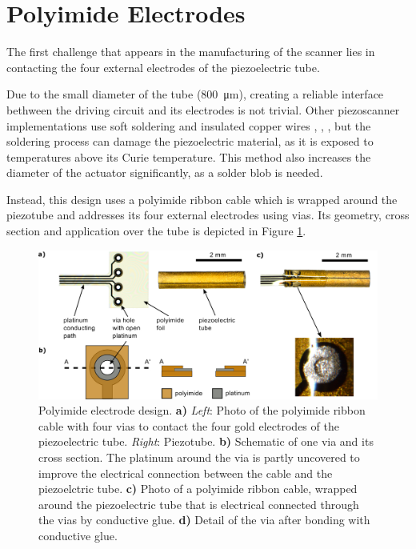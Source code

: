 \section{Polyimide Electrodes}
The first challenge that appears in the manufacturing of the scanner lies in contacting the four external electrodes of the piezoelectric tube. 

Due to the small diameter of the tube (\SI{800}{\micro\meter}), creating a reliable interface bethween the driving circuit and its electrodes is not trivial. Other piezoscanner implementations use soft soldering and insulated copper wires \cite{Lee2010}, \cite{Meinert}, \cite{Huo2010}, but the soldering process can damage the piezoelectric material, as it is exposed to temperatures above its Curie temperature. This method also increases the diameter of the actuator significantly, as a solder blob is needed. %

Instead, this design uses a polyimide ribbon cable which is wrapped around the piezotube and addresses its four external electrodes using vias. Its geometry, cross section and application over the tube is depicted in Figure \ref{fig:piRolled}. 

\begin{figure}[h!]\centering \includegraphics[width=15cm]{figures/40_Fabrication/PI/tubeFoilH.png}
      \caption{Polyimide electrode design.
      \textbf{a)} \textit{Left}: Photo of the polyimide ribbon cable with four vias to contact the four gold electrodes of the piezoelectric tube. \textit{Right}: Piezotube.
      \textbf{b)} Schematic of one via and its cross section. The platinum around the via is partly uncovered to improve the electrical connection between the cable and the piezoelctric tube.
      \textbf{c)} Photo of a polyimide ribbon cable, wrapped around the piezoelectric tube that is electrical connected through the vias by conductive glue.
      \textbf{d)} Detail of the via after bonding with conductive glue.}
      \label{fig:piRolled}
\end{figure}

